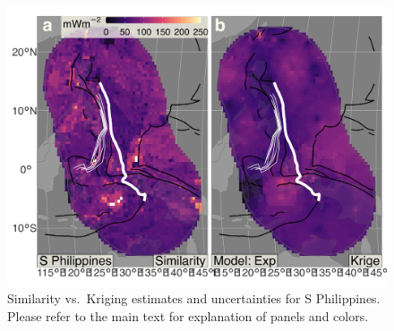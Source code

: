 \begin{figure}
\centering
\includegraphics{assets/figs/chpt3/SPhilippinesDiffComp.png}
\caption[Similarity vs.~Kriging estimates and uncertainties for S Philippines]{Similarity vs.~Kriging estimates and uncertainties for S Philippines. Please refer to the main text for explanation of panels and colors.}
\end{figure}

